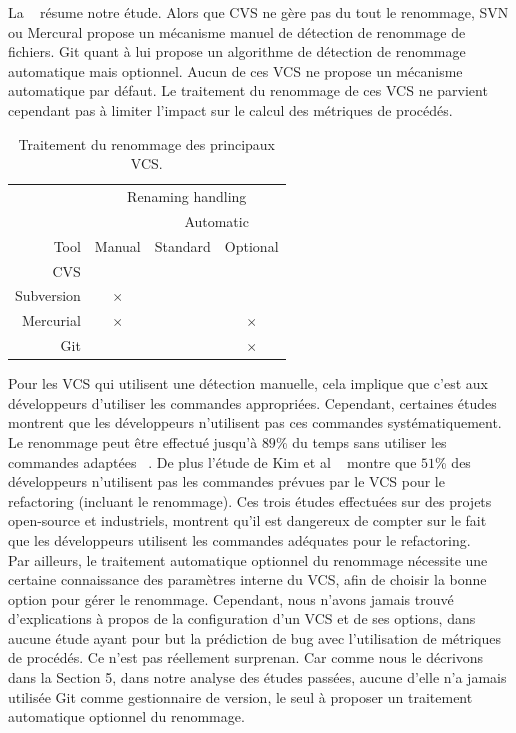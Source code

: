 La ~ résume notre étude. Alors que CVS ne gère pas du tout le renommage, SVN ou Mercural propose un mécanisme manuel de détection de renommage de fichiers. Git quant à lui propose un algorithme de détection de renommage automatique mais optionnel. Aucun de ces VCS ne propose un mécanisme automatique par défaut. Le traitement du renommage de ces VCS ne parvient cependant pas à limiter l'impact sur le calcul des métriques de procédés.\\ 

\begin{table}[h]
\centering
\begin{tabular}{rccc}
\toprule
 & \multicolumn{3}{c}{Renaming handling}\\
\cmidrule{2-4}
& & \multicolumn{2}{c}{Automatic}\\
\cmidrule{3-4}
Tool & Manual & Standard & Optional\\
\midrule
CVS & & &\\
Subversion & $\times$ & &\\
Mercurial & $\times$ & & $\times$\\
Git & & & $\times$\\
\bottomrule
\end{tabular}
\caption{Traitement du renommage des principaux VCS.}
\label{tab:vcs}
\end{table}

Pour les VCS qui utilisent une détection manuelle, cela implique que c'est aux développeurs d'utiliser les commandes appropriées. Cependant, certaines études montrent que les développeurs n'utilisent pas ces commandes systématiquement. Le renommage peut être effectué jusqu'à $89\%$ du temps sans utiliser les commandes adaptées ~\cite{lavoie_inferring_2012,steidl_incremental_2014}. De plus l'étude de Kim et al ~\cite{kim_field_2012} montre que $51$\% des développeurs n'utilisent pas les commandes prévues par le VCS pour le refactoring (incluant le renommage). Ces trois études effectuées sur des projets open-source et industriels, montrent qu'il est dangereux de compter sur le fait que les développeurs utilisent les commandes adéquates pour le refactoring.\\

Par ailleurs, le traitement automatique optionnel du renommage nécessite une certaine connaissance des paramètres interne du VCS, afin de choisir la bonne option pour gérer le renommage. Cependant, nous n'avons jamais trouvé d'explications à propos de la configuration d'un VCS et de ses options, dans aucune étude ayant pour but la prédiction de bug avec l'utilisation de métriques de procédés. Ce n'est pas réellement surprenan. Car comme nous le décrivons dans la Section 5, dans notre analyse des études passées, aucune d'elle n'a jamais utilisée Git comme gestionnaire de version, le seul à proposer un traitement automatique optionnel du renommage.\\

